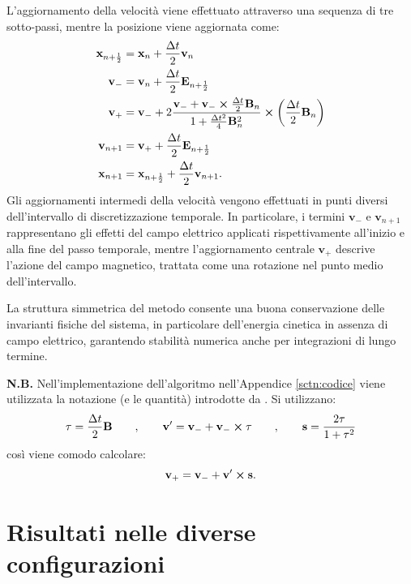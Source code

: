 \documentclass[10pt,a4paper]{article}
\begin{document}
L'aggiornamento della velocità viene effettuato attraverso una sequenza di tre sotto-passi, mentre la posizione viene aggiornata come:
\begin{align}
    \mathbf{x}_{n+\frac{1}{2}} &= \mathbf{x}_n + \frac{\Delta t}{2}\mathbf{v}_n \notag \\
    \mathbf{v}_- &= \mathbf{v}_n + \frac{\Delta t}{2}\mathbf{E}_{n+\frac{1}{2}} \notag \\
    \mathbf{v}_+ &= \mathbf{v}_- + 2\frac{ \mathbf{v}_- + \mathbf{v}_- \cross \frac{\Delta t}{2}\mathbf{B}_n }{ 1 + \frac{\Delta t^2}{4}\mathbf{B}_n^2 }\cross\left( \frac{\Delta t}{2}\mathbf{B}_n \right) \\
    \mathbf{v}_{n+1} &= \mathbf{v}_+ + \frac{\Delta t}{2}\mathbf{E}_{n+\frac{1}{2}} \notag \\
    \mathbf{x}_{n+1} &= \mathbf{x}_{n+\frac{1}{2}} + \frac{\Delta t}{2}\mathbf{v}_{n+1}. \notag
\end{align}
Gli aggiornamenti intermedi della velocità vengono effettuati in punti diversi dell'intervallo di discretizzazione temporale. In particolare, i termini $\mathbf{v}_-$ e $\mathbf{v}_{n+1}$ rappresentano gli effetti del campo elettrico applicati rispettivamente all'inizio e alla fine del passo temporale, mentre l'aggiornamento centrale $\mathbf{v}_+$ descrive l'azione del campo magnetico, trattata come una rotazione nel punto medio dell'intervallo. 

La struttura simmetrica del metodo consente una buona conservazione delle invarianti fisiche del sistema, in particolare dell'energia cinetica in assenza di campo elettrico, garantendo stabilità numerica anche per integrazioni di lungo termine.

\textbf{N.B.} Nell'implementazione dell'algoritmo nell'Appendice \ref{sctn:codice} viene utilizzata la notazione (e le quantità) introdotte da \cite{PICvxB2011}. Si utilizzano:
\begin{equation}
    \mathbf{\tau} = \frac{\Delta t}{2} \mathbf{B} \qquad , \qquad \mathbf{v}^\prime = \mathbf{v}_- + \mathbf{v}_- \cross \mathbf{\tau} \qquad , \qquad \mathbf{s} = \frac{2\mathbf{\tau}}{1+\mathbf{\tau}^2}
\end{equation}
così viene comodo calcolare:
\begin{equation}
    \mathbf{v}_+ = \mathbf{v}_- + \mathbf{v}^\prime\cross\mathbf{s}.
\end{equation}


\section{Risultati nelle diverse configurazioni\label{sctn:risultati}}
\end{document}
